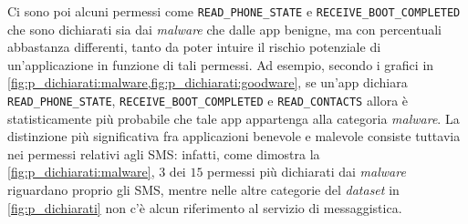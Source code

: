 \documentclass[12pt,a4paper,oneside]{article}
\begin{document}
\noindent Ci sono poi alcuni permessi come \texttt{READ\_PHONE\_STATE} e \texttt{RECEIVE\_BOOT\_COMPLETED} che sono dichiarati sia dai \textit{malware} che dalle app benigne, ma con percentuali abbastanza differenti, tanto da poter intuire il rischio potenziale di un'applicazione in funzione di tali permessi. Ad esempio, secondo i grafici in \cref{fig:p_dichiarati:malware,fig:p_dichiarati:goodware}, se un'app dichiara \texttt{READ\_PHONE\_STATE}, \texttt{RECEIVE\_BOOT\_COMPLETED} e \texttt{READ\_CONTACTS} allora è statisticamente più probabile che tale app appartenga alla categoria \textit{malware}. La distinzione più significativa fra applicazioni benevole e malevole consiste tuttavia nei permessi relativi agli SMS: infatti, come dimostra la \cref{fig:p_dichiarati:malware}, $3$ dei $15$ permessi più dichiarati dai \textit{malware} riguardano proprio gli SMS, mentre nelle altre categorie del \textit{dataset} in \cref{fig:p_dichiarati} non c'è alcun riferimento al servizio di messaggistica.
\end{document}
